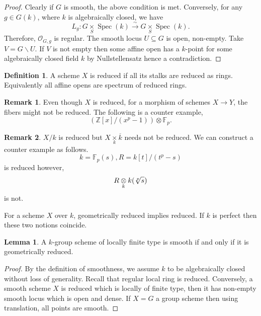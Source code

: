 \documentclass[10pt]{article}
\numberwithin{equation}{section}
\theoremstyle{definition}
\newtheorem{definition}{Definition}[section]
\newtheorem{lemma}{Lemma}[section]
\newtheorem{remark}{Remark}[section]
\DeclareMathOperator{\Spec}{Spec}
\newcommand{\Z}[0]{\mathbb{Z}}
\newcommand{\bF}[0]{\mathbb{F}}
\newcommand{\cO}[0]{\mathcal{O}}
\newcommand{\fib}[1]{%
  \mathbin{\mathop{\times}\limits_{#1}}%
}
\newcommand{\tens}[1]{%
  \mathbin{\mathop{\otimes}\displaylimits_{#1}}%
}
\begin{document}
\begin{proof}
    Clearly if $G$ is smooth, the above condition is met. Conversely, for any $g\in G(k)$, where $k$ is algebraically closed, we have
    \begin{equation*}
        L_g:G\fib{S}\Spec(k)\stackrel{\sim}{\to} G\fib{S}\Spec(k).
    \end{equation*}
    Therefore, $\cO_{G,g}$ is regular. The smooth locus $U\subseteq G$ is open, non-empty. Take $V= G\backslash U$. If $V$ is not empty then some affine open has a $k$-point for some algebraically closed field $k$ by Nullstellensatz hence a contradiction.
\end{proof}
\begin{definition}
    A scheme $X$ is reduced if all its stalks are reduced as rings. Equivalently all affine opens are spectrum of reduced rings.
\end{definition}
\begin{remark}
    Even though $X$ is reduced, for a morphism of schemes $X\to Y$, the fibers might not be reduced. The following is a counter example,
    \begin{equation*}
        (\Z[x]/(x^p-1))\otimes \bF_p.
    \end{equation*}
\end{remark}
\begin{remark}
    $X/k$ is reduced but $X\fib{k}\overline{k}$ needs not be reduced. We can construct a counter example as follows.
    \begin{equation*}
        k = \bF_p(s), R = k[t]/(t^p-s)
    \end{equation*}
    is reduced however,
    \begin{equation*}
        R\tens{k}k(\sqrt[p]{s})
    \end{equation*}
    is not.
\end{remark}
For a scheme $X$ over $k$, geometrically reduced implies reduced. If $k$ is perfect then these two notions coincide.
\begin{lemma}
    \label{lemma_17}
    A $k$-group scheme of locally finite type is smooth if and only if it is geometrically reduced.
\end{lemma}
\begin{proof}
    By the definition of smoothness, we assume $k$ to be algebraically closed without loss of generality.
    Recall that regular local ring is reduced. Conversely, a smooth scheme $X$ is reduced which is locally of finite type, then it has non-empty smooth locus which is open and dense.
    If $X=G$ a group scheme then using translation, all points are smooth.
\end{proof}
\end{document}
